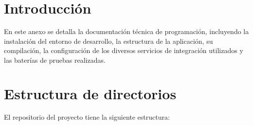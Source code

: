
\section{Introducción}\label{introducción-manial-programador}

En este anexo se detalla la documentación técnica de programación, incluyendo la instalación del entorno de desarrollo, la estructura de la aplicación, su compilación, la configuración de los diversos servicios de integración utilizados y las baterías de pruebas realizadas.

\section{Estructura de directorios}\label{estructura-de-directorios}

El repositorio del proyecto tiene la siguiente estructura:


